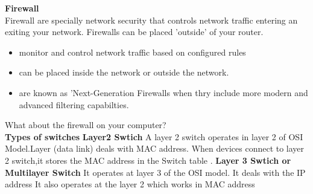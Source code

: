 \documentclass{report}
\begin{document}
	\textbf{Firewall}\\ Firewall are specially network security that controls
	network traffic entering an exiting your network. Firewalls can be placed 'outside'
	of your router.\\
	\begin{itemize}
		\item monitor and control network traffic based on configured rules

		\item can be placed inside the network or outside the network.

		\item are known as 'Next-Generation Firewalls when thry include more modern
			and advanced filtering capabilties.
	\end{itemize}
	What about the firewall on your computer?\\
	\textbf{Types of switches}
	\textbf{Layer2 Swtich}
	A layer 2 switch operates in layer 2 of OSI Model.Layer (data link) deals with MAC address. 
	When devices connect to layer 2 switch,it stores the MAC address in the Switch table .
	\textbf{Layer 3 Swtich or Multilayer Switch}
	It operates at layer 3 of the OSI model. It deals with the IP address It also operates at the layer 2 which works in MAC address
\end{document}
